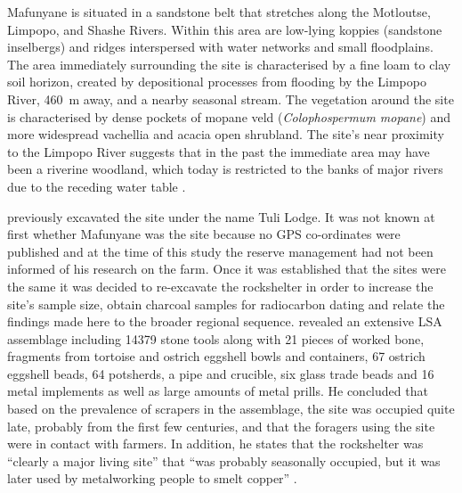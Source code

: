 	Mafunyane  is situated in a sandstone belt that stretches along the Motloutse, Limpopo, and Shashe Rivers. Within this area are low-lying koppies (sandstone inselbergs) and ridges interspersed with water networks and small floodplains. The area immediately surrounding the site is characterised by a fine loam to clay soil horizon, created by depositional processes from flooding by the Limpopo River, \SI{460}{\meter} away, and a nearby seasonal stream. 
	The vegetation around the site is characterised by dense pockets of mopane veld (\emph{Colophospermum mopane}) and more widespread vachellia and acacia open shrubland. The site’s near proximity to the Limpopo River suggests that in the past the immediate area may have been a riverine woodland, which today is restricted to the banks of major rivers due to the receding water table \parencite{Alexander_1984}.
	
	\textcite{Walker_1994} previously excavated the site under the name Tuli Lodge. It was not known at first whether Mafunyane was the \textcite{Walker_1994} site because no GPS co-ordinates were published and at the time of this study the reserve management had not been informed of his research on the farm. Once it was established that the sites were the same it was decided to re-excavate the rockshelter in order to increase the site’s sample size, obtain charcoal samples for radiocarbon dating and relate the findings made here to the broader regional sequence. \textcite{Walker_1994} revealed an extensive LSA assemblage including \num{14379} stone tools along with 21 pieces of worked bone, fragments from tortoise and ostrich eggshell bowls and containers, 67 ostrich eggshell beads, 64 potsherds, a pipe and crucible, six glass trade beads and 16 metal implements as well as large amounts of metal prills. 
	He concluded that based on the prevalence of scrapers in the assemblage, the site was occupied quite late, probably from the first few centuries\AD, and that the foragers using the site were in contact with farmers. 
In addition, he states that the rockshelter was \enquote{clearly a major living site} that 
	\enquote{was probably seasonally occupied, but it was later used by metalworking people to smelt copper} \parencite[10]{Walker_1994}. 
	
